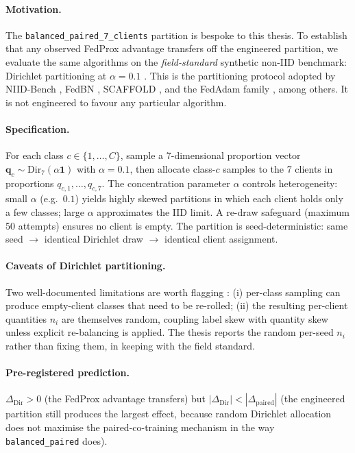 \paragraph{Motivation.}
The \texttt{balanced\_paired\_7\_clients} partition is bespoke
to this thesis. To establish that any observed FedProx advantage
transfers off the engineered partition, we evaluate the same
algorithms on the \emph{field-standard} synthetic non-IID benchmark:
Dirichlet partitioning at $\alpha = 0.1$ \citep{hsu2019dirichlet}.
This is the partitioning protocol adopted by NIID-Bench
\citep{li2022niidbench}, FedBN \citep{li2021fedbn},
SCAFFOLD \citep{karimireddy2020scaffold}, and the FedAdam family
\citep{reddi2021adaptive}, among others. It is not engineered to
favour any particular algorithm.

\paragraph{Specification.}
For each class $c \in \{1, \dots, C\}$, sample a 7-dimensional
proportion vector $\bm{q}_c \sim \mathrm{Dir}_7(\alpha\bm{1})$ with
$\alpha = 0.1$, then allocate class-$c$ samples to the 7 clients
in proportions $q_{c,1}, \dots, q_{c,7}$. The concentration
parameter $\alpha$ controls heterogeneity: small $\alpha$ (e.g.\
$0.1$) yields highly skewed partitions in which each client holds
only a few classes; large $\alpha$ approximates the IID limit.
A re-draw safeguard (maximum 50 attempts) ensures no client is
empty. The partition is seed-deterministic: same seed $\to$
identical Dirichlet draw $\to$ identical client assignment.

\paragraph{Caveats of Dirichlet partitioning.}
Two well-documented limitations are worth flagging
\citep{hsu2019dirichlet,li2022niidbench}: (i) per-class sampling can
produce empty-client classes that need to be re-rolled; (ii) the
resulting per-client quantities $n_i$ are themselves random,
coupling label skew with quantity skew unless explicit
re-balancing is applied. The thesis reports the random per-seed
$n_i$ rather than fixing them, in keeping with the field standard.

\paragraph{Pre-registered prediction.}
$\Delta_{\mathrm{Dir}} > 0$ (the FedProx advantage transfers) but
$|\Delta_{\mathrm{Dir}}| < |\Delta_{\mathrm{paired}}|$ (the engineered
partition still produces the largest effect, because random
Dirichlet allocation does not maximise the paired-co-training
mechanism in the way \texttt{balanced\_paired} does).

